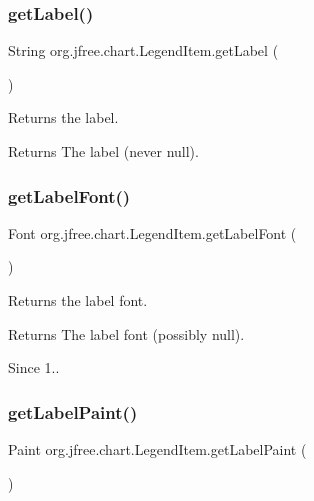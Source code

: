 \subsubsection{\texorpdfstring{get\+Label()}{getLabel()}}
{\footnotesize\ttfamily String org.\+jfree.\+chart.\+Legend\+Item.\+get\+Label (\begin{DoxyParamCaption}{ }\end{DoxyParamCaption})}

Returns the label.

\begin{DoxyReturn}{Returns}
The label (never {\ttfamily null}). 
\end{DoxyReturn}
\mbox{\label{classorg_1_1jfree_1_1chart_1_1_legend_item_a7939e242876cc988636afd595e47eee7}} 
\subsubsection{\texorpdfstring{get\+Label\+Font()}{getLabelFont()}}
{\footnotesize\ttfamily Font org.\+jfree.\+chart.\+Legend\+Item.\+get\+Label\+Font (\begin{DoxyParamCaption}{ }\end{DoxyParamCaption})}

Returns the label font.

\begin{DoxyReturn}{Returns}
The label font (possibly {\ttfamily null}).
\end{DoxyReturn}
\begin{DoxySince}{Since}
1.. 
\end{DoxySince}
\mbox{\label{classorg_1_1jfree_1_1chart_1_1_legend_item_a241d7f99531c0d5b85180111e8edb031}} 
\subsubsection{\texorpdfstring{get\+Label\+Paint()}{getLabelPaint()}}
{\footnotesize\ttfamily Paint org.\+jfree.\+chart.\+Legend\+Item.\+get\+Label\+Paint (\begin{DoxyParamCaption}{ }\end{DoxyParamCaption})}

